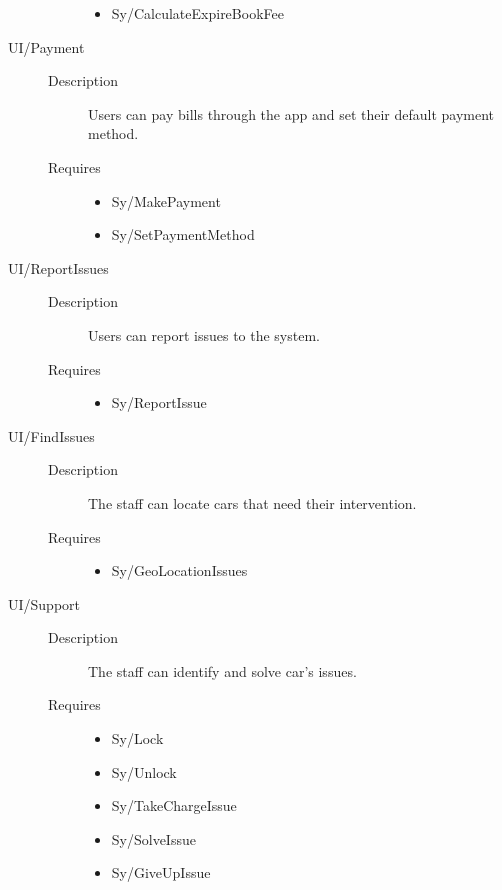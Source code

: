 \documentclass[11pt]{article} %
\begin{document}
\begin{description}
\begin{description}
\begin{itemize}
			\item Sy/CalculateExpireBookFee
		\end{itemize}
	\end{description}
	\item[UI/Payment] \hfill
	\begin{description}
		\item[Description] Users can pay bills through the app and set their default payment method.
		\item[Requires] \hfill
		\begin{itemize}
			\item Sy/MakePayment %
			\item Sy/SetPaymentMethod %
		\end{itemize}
	\end{description}
	\item[UI/ReportIssues] \hfill
	\begin{description}
		\item[Description] Users can report issues to the system.
		\item[Requires] \hfill
		\begin{itemize}
			\item Sy/ReportIssue %
		\end{itemize}
	\end{description}
	\item[UI/FindIssues] \hfill
	\begin{description}
		\item[Description] The staff can locate cars that need their intervention.
		\item[Requires] \hfill
		\begin{itemize}
			\item Sy/GeoLocationIssues %
		\end{itemize}
	\end{description}
	\item[UI/Support] \hfill
	\begin{description}
		\item[Description] The staff can identify and solve car’s issues.
		\item[Requires] \hfill
		\begin{itemize}
			\item Sy/Lock %
			\item Sy/Unlock %
			\item Sy/TakeChargeIssue  %
			\item Sy/SolveIssue %
			\item Sy/GiveUpIssue %
		\end{itemize}
	\end{description}
\end{description}
\end{document}
